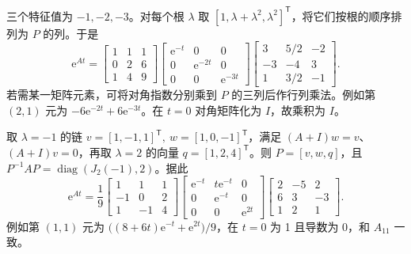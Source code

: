 

\sol 三个特征值为 $-1,-2,-3$。对每个根 $\lambda$ 取 $[1,\lambda+\lambda^2,\lambda^2]^{\mathsf T}$，将它们按根的顺序排列为 $P$ 的列。于是
\[
\mathrm e^{At}=
\begin{bmatrix}1&1&1\\0&2&6\\1&4&9\end{bmatrix}
\begin{bmatrix}\mathrm e^{-t}&0&0\\0&\mathrm e^{-2t}&0\\0&0&\mathrm e^{-3t}\end{bmatrix}
\begin{bmatrix}3&5/2&-2\\-3&-4&3\\1&3/2&-1\end{bmatrix}.
\]
若需某一矩阵元素，可将对角指数分别乘到 $P$ 的三列后作行列乘法。例如第 $(2,1)$ 元为 $-6\mathrm e^{-2t}+6\mathrm e^{-3t}$。在 $t=0$ 对角矩阵化为 $I$，故乘积为 $I$。



\sol 取 $\lambda=-1$ 的链 $v=[1,-1,1]^{\mathsf T},\ w=[1,0,-1]^{\mathsf T}$，满足 $(A+I)w=v$、$(A+I)v=0$，再取 $\lambda=2$ 的向量 $q=[1,2,4]^{\mathsf T}$。则 $P=[v,w,q]$，且 $P^{-1}AP=\operatorname{diag}(J_2(-1),2)$。据此
\[
\mathrm e^{At}=\frac19
\begin{bmatrix}1&1&1\\-1&0&2\\1&-1&4\end{bmatrix}
\begin{bmatrix}\mathrm e^{-t}&t\mathrm e^{-t}&0\\0&\mathrm e^{-t}&0\\0&0&\mathrm e^{2t}\end{bmatrix}
\begin{bmatrix}2&-5&2\\6&3&-3\\1&2&1\end{bmatrix}.
\]
例如第 $(1,1)$ 元为 $\bigl((8+6t)\mathrm e^{-t}+\mathrm e^{2t}\bigr)/9$，在 $t=0$ 为 1 且导数为 0，和 $A_{11}$ 一致。

